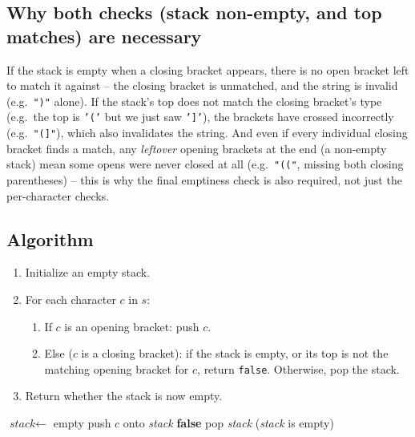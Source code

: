 \subsection*{Why both checks (stack non-empty, and top matches) are necessary}

If the stack is empty when a closing bracket appears, there is no
open bracket left to match it against -- the closing bracket is
unmatched, and the string is invalid (e.g.\ \texttt{")"} alone). If the
stack's top does not match the closing bracket's type (e.g.\ the top is
\texttt{'('} but we just saw \texttt{']'}), the brackets have crossed
incorrectly (e.g.\ \texttt{"(]"}), which also invalidates the string. And
even if every individual closing bracket finds a match, any \emph{leftover}
opening brackets at the end (a non-empty stack) mean some opens were never
closed at all (e.g.\ \texttt{"(("}, missing both closing parentheses) --
this is why the final emptiness check is also required, not just the
per-character checks.

\subsection*{Algorithm}

\begin{enumerate}
  \item Initialize an empty stack.
  \item For each character $c$ in $s$:
  \begin{enumerate}
    \item If $c$ is an opening bracket: push $c$.
    \item Else ($c$ is a closing bracket): if the stack is empty, or its
          top is not the matching opening bracket for $c$, return
          \texttt{false}. Otherwise, pop the stack.
  \end{enumerate}
  \item Return whether the stack is now empty.
\end{enumerate}

\begin{algorithm}[H]
\caption{Valid Parentheses}
\begin{algorithmic}[1]
  \State $\textit{stack} \gets$ empty
    \If{$c \in \{(, [, \{\}$}
      \State push $c$ onto \textit{stack}
    \Else
        \State \Return \textbf{false}
      \EndIf
      \State pop \textit{stack}
    \EndIf
  \EndFor
  \State \Return (\textit{stack} is empty)
\EndProcedure
\end{algorithmic}
\end{algorithm}

